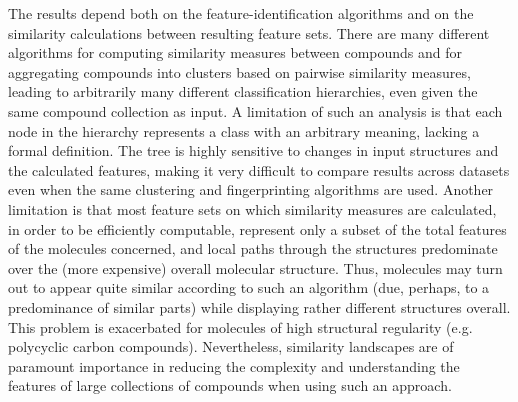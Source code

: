 \documentclass[10pt]{bmc_article}
\newenvironment{bmcformat}{\baselineskip20pt\sloppy\setboolean{publ}{false}}{\baselineskip20pt\sloppy}
\begin{document}
\begin{bmcformat}
The results depend both on the feature-identification algorithms and on the similarity calculations between resulting feature sets. There are many different algorithms for computing similarity measures between compounds and for aggregating compounds into clusters based on pairwise similarity measures, leading to arbitrarily many different classification hierarchies, even given the same compound collection as input.  A limitation of such an analysis is that each node in the hierarchy represents a class with an arbitrary meaning, lacking a formal definition.  The tree is highly sensitive to changes in input structures and the calculated features, making it very difficult to compare results across datasets even when the same clustering and fingerprinting algorithms are used. Another limitation is that most feature sets on which similarity measures are calculated, in order to be efficiently computable, represent only a subset of the total features of the molecules concerned, and local paths through the structures predominate over the (more expensive) overall molecular structure. Thus, molecules may turn out to appear quite similar according to such an algorithm (due, perhaps, to a predominance of similar parts) while displaying rather different structures overall.  This problem is exacerbated for molecules of high structural regularity (e.g. polycyclic carbon compounds).  Nevertheless, similarity landscapes are of paramount importance %
in reducing the complexity and understanding the features of large collections of compounds when using such an approach.
 


\end{bmcformat}
\end{document}

